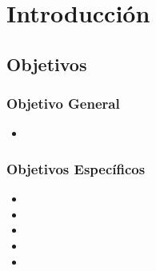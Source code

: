 \section{Introducción}


\subsection{Objetivos}



\subsubsection{Objetivo General}
\begin{itemize}
\item 
\end{itemize}

\subsubsection{Objetivos Específicos}
\begin{itemize}
\item 
\item 
\item 
\item
\item 
\end{itemize}


% 
%

